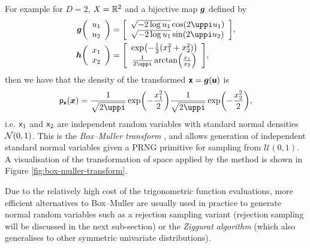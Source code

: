 For example for $D=2$, $\mathit{X} = \mathbb{R}^2$ and a bijective map $\boldsymbol{g}$ defined by
\begin{equation}\label{eq:box-muller-transform}
\begin{split}
  \vct{g}\lpa\begin{array}{c} u_1\\u_2\end{array}\rpa &=
  \lsb\begin{array}{c} \sqrt{-2\log u_1}\cos(2\uppi u_1) \\ \sqrt{-2\log u_1}\sin(2\uppi u_2)\end{array}\rsb,
  \\
  \vct{h}\lpa\begin{array}{c} x_1\\x_2\end{array}\rpa &=
  \lsb\begin{array}{c} \exp\lpa-\frac{1}{2}(x_1^2+x_2^2)\rpa \\ \frac{1}{2\uppi}\arctan\lpa\frac{x_1}{x_2}\rpa\end{array}\rsb,
\end{split}
\end{equation}
then we have that the density of the transformed $\boldsymbol{\mathsf{x}} = \boldsymbol{g}(\boldsymbol{\mathsf{u}})$ is
\begin{equation}\label{eq:box-muller-transform-density}
  \pden{\rvct{x}}(\vct{x}) = 
  \frac{1}{\sqrt{2\uppi}}\exp\lpa-\frac{x_1^2}{2}\rpa
  \frac{1}{\sqrt{2\uppi}}\exp\lpa-\frac{x_2^2}{2}\rpa ,
\end{equation}
i.e. $\mathsf{x}_1$ and $\mathsf{x}_2$ are independent random variables with standard normal densities $\nrm{0,1}$. This is the \emph{Box--Muller transform} \citep{box1958note}, and allows generation of independent standard normal variables given a \ac{PRNG} primitive for sampling from $\mathcal{U}(0,1)$. A visualisation of the transformation of space applied by the method is shown in Figure \ref{fig:box-muller-transform}. 

Due to the relatively high cost of the trigonometric function evaluations, more efficient alternatives to Box--Muller are usually used in practice to generate normal random variables such as a rejection sampling variant \citep{marsaglia1968random} (rejection sampling will be discussed in the next sub-section) or the \emph{Ziggurat algorithm} \citep{marsaglia2000ziggurat} (which also generalises to other symmetric univariate distributions).

